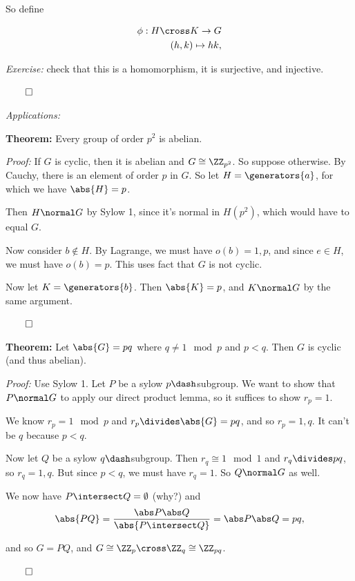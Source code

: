 So define

\begin{align*}
\phi: H \cross K \to G \\
(h, k) \mapsto hk
,\end{align*}

\emph{Exercise:} check that this is a homomorphism, it is surjective,
and injective.

\(\qed\)

\emph{Applications:}

\textbf{Theorem:} Every group of order \(p^2\) is abelian.

\emph{Proof:} If \(G\) is cyclic, then it is abelian and
\(G \cong \ZZ_{p^2}\). So suppose otherwise. By Cauchy, there is an
element of order \(p\) in \(G\). So let \(H = \generators{a}\), for
which we have \(\abs{H} = p\).

Then \(H \normal G\) by Sylow 1, since it's normal in \(H(p^2)\), which
would have to equal \(G\).

Now consider \(b\not\in H\). By Lagrange, we must have \(o(b) = 1, p\),
and since \(e\in H\), we must have \(o(b) = p\). This uses fact that
\(G\) is not cyclic.

Now let \(K = \generators{b}\). Then \(\abs{K} = p\), and
\(K \normal G\) by the same argument.

\(\qed\)

\textbf{Theorem:} Let \(\abs{G} = pq\) where \(q\neq 1 \mod p\) and
\(p < q\). Then \(G\) is cyclic (and thus abelian).

\emph{Proof:} Use Sylow 1. Let \(P\) be a sylow \(p\dash\)subgroup. We
want to show that \(P \normal G\) to apply our direct product lemma, so
it suffices to show \(r_p = 1\).

We know \(r_p = 1 \mod p\) and \(r_p \divides \abs{G} = pq\), and so
\(r_p = 1,q\). It can't be \(q\) because \(p < q\).

Now let \(Q\) be a sylow \(q\dash\)subgroup. Then \(r_q \cong 1 \mod 1\)
and \(r_q \divides pq\), so \(r_q = 1, q\). But since \(p< q\), we must
have \(r_q = 1\). So \(Q \normal G\) as well.

We now have \(P \intersect Q = \emptyset\) (why?) and
\begin{align*}
\abs{PQ} = \frac{\abs P \abs Q}{ \abs{P \intersect Q} } = \abs P \abs Q = pq,
\end{align*}

and so \(G = PQ\), and \(G \cong \ZZ_p \cross \ZZ_q \cong \ZZ_{pq}\).

\(\qed\)

